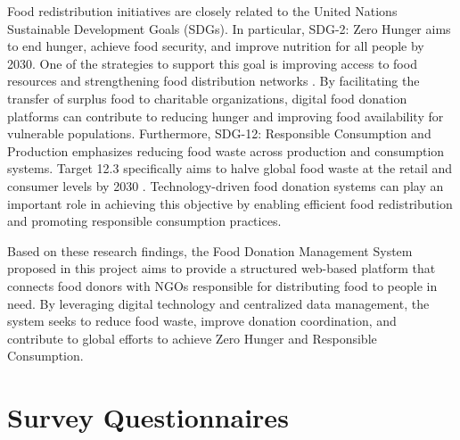 Food redistribution initiatives are closely related to the United Nations Sustainable Development Goals (SDGs). In particular, SDG-2: Zero Hunger aims to end hunger, achieve food security, and improve nutrition for all people by 2030. One of the strategies to support this goal is improving access to food resources and strengthening food distribution networks \cite{lee2016transforming}. By facilitating the transfer of surplus food to charitable organizations, digital food donation platforms can contribute to reducing hunger and improving food availability for vulnerable populations.
Furthermore, SDG-12: Responsible Consumption and Production emphasizes reducing food waste across production and consumption systems. Target 12.3 specifically aims to halve global food waste at the retail and consumer levels by 2030 \cite{flanagan2019reducing}. Technology-driven food donation systems can play an important role in achieving this objective by enabling efficient food redistribution and promoting responsible consumption practices.

Based on these research findings, the Food Donation Management System proposed in this project aims to provide a structured web-based platform that connects food donors with NGOs responsible for distributing food to people in need. By leveraging digital technology and centralized data management, the system seeks to reduce food waste, improve donation coordination, and contribute to global efforts to achieve Zero Hunger and Responsible Consumption.



\vspace{40pt}
\section{Survey Questionnaires}


